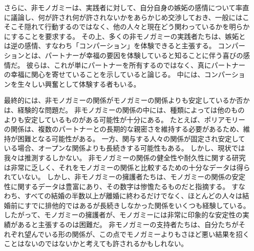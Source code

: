 \documentclass[paper=a4,book,openany]{jlreq}
\begin{document}
さらに、非モノガミーは、実践者に対して、自分自身の嫉妬の感情について率直に議論し、何が許され何が許されないかをあらかじめ交渉しておき、一般にはこそこそ隠れて行動するのではなく、他の人々と現在どう関わっているかを明らかにすることを要求する。
その上、多くの非モノガミーの実践者たちは、嫉妬とは逆の感情、すなわち「コンパーション」を体験できると主張する。
コンパーションとは、パートナーが幸福の要因を体験していると知ることに伴う喜びの感情だ。
彼らは、これが単にパートナーを所有するのではなく、真にパートナーの幸福に関心を寄せていることを示していると論じる。
中には、コンパーションを生々しい興奮として体験する者もいる\citep{sousa18:_love_jealous_comper}。

最終的には、非モノガミーの関係がモノガミーの関係よりも安定しているか否かは、経験的な問題だ。
非モノガミーの関係の中には、種類によっては他のものよりも安定しているものがある可能性が十分にある。
たとえば、ポリアモリーの関係は、複数のパートナーとの長期的な親密さを維持する必要があるため、維持が困難となる可能性がある。
一方、関与する人々の関係が固定され安定している場合、オープンな関係よりも長続きする可能性もある。
しかし、現状では我々は推測するしかない。
非モノガミーの関係の健全性や耐久性に関する研究は非常に乏しく、それをモノガミーの関係と比較するための十分なデータは得られていない。
しかし、非モノガミーの擁護者たちは、モノガミーの関係の安定性に関するデータは豊富にあり、その数字は惨憺たるものだと指摘する。
すなわち、すべての結婚の半数以上が離婚に終わるだけでなく、ほとんどの人々は結婚前にすでに排他的ではあるが長続きしなかった関係をいくつも経験している。
したがって、モノガミーの擁護者が、モノガミーには非常に印象的な安定性の実績があると主張するのは困難だ。
非モノガミーの支持者たちは、自分たちがそれぞれ望んでいる形の関係が、この点でモノガミーよりもさほど悪い結果を招くことはないのではないかと考えても許されるかもしれない。
\end{document}
